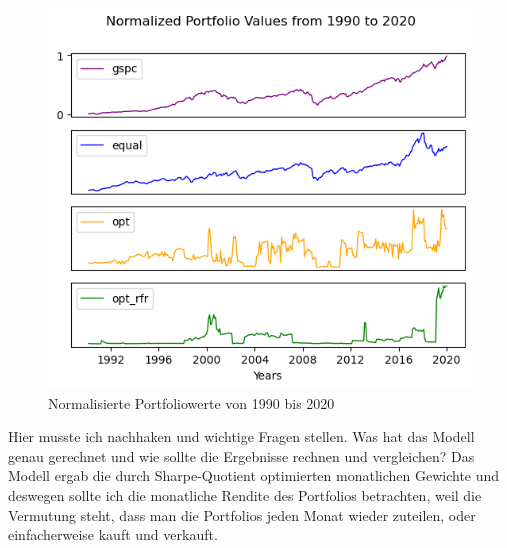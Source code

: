 \documentclass[12pt]{article}
\begin{document}
            \begin{figure}[ht]
            
                \begin{center}

                    \includegraphics[scale=0.8]{normalized-portfolio-1990-2020.png}
                    \caption{Normalisierte Portfoliowerte von 1990 bis 2020}
                    \label{n-portfoliowerte-fig}
        
                \end{center}
                
            \end{figure}

            Hier musste ich nachhaken und wichtige Fragen stellen. Was hat das Modell genau gerechnet 
            und wie sollte die Ergebnisse rechnen und vergleichen? 
            Das Modell ergab die durch Sharpe-Quotient optimierten monatlichen Gewichte und 
            deswegen sollte ich die monatliche Rendite des Portfolios betrachten, weil die Vermutung steht, 
            dass man die Portfolios jeden Monat wieder zuteilen, oder einfacherweise kauft und verkauft.
            
\end{document}
